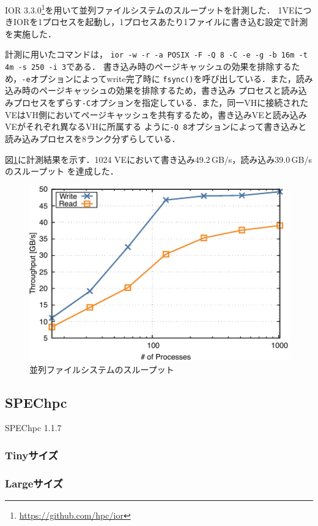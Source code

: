 ﻿\documentclass[submit,techrep,noauthor]{ipsj}
\begin{document}
IOR 3.3.0\footnote{\url{https://github.com/hpc/ior}}を用いて並列ファイルシステムのスループットを計測した．
1VEにつきIORを1プロセスを起動し，1プロセスあたり1ファイルに書き込む設定で計測を実施した．

計測に用いたコマンドは，
\texttt{ior -w -r -a POSIX -F -Q 8 -C -e -g -b 16m -t 4m -s 250 -i 3}である．
書き込み時のページキャッシュの効果を排除するため，\texttt{-e}オプションによってwrite完了時に
\texttt{fsync()}を呼び出している．また，読み込み時のページキャッシュの効果を排除するため，書き込み
プロセスと読み込みプロセスをずらす\texttt{-C}オプションを指定している．また，同一VHに接続された
VEはVH側においてページキャッシュを共有するため，書き込みVEと読み込みVEがそれぞれ異なるVHに所属する
ように\texttt{-Q 8}オプションによって書き込みと読み込みプロセスを8ランク分ずらしている．

図\ref{fig:ior}に計測結果を示す．1024 VEにおいて書き込み49.2\,GB/s，読み込み39.0\,GB/sのスループット
を達成した．

\begin{figure}
  \centering
  \includegraphics{figs/ior.pdf}
  \caption{並列ファイルシステムのスループット}\label{fig:ior}
\end{figure}

\subsection{SPEChpc}

SPEChpc 1.1.7

\subsubsection{Tinyサイズ}

\subsubsection{Largeサイズ}
\end{document}
